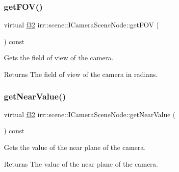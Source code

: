 \subsubsection{\texorpdfstring{get\+F\+O\+V()}{getFOV()}}
{\footnotesize\ttfamily virtual \hyperlink{namespaceirr_a0277be98d67dc26ff93b1a6a1d086b07}{f32} irr\+::scene\+::\+I\+Camera\+Scene\+Node\+::get\+F\+OV (\begin{DoxyParamCaption}{ }\end{DoxyParamCaption}) const\hspace{0.3cm}{\ttfamily [pure virtual]}}



Gets the field of view of the camera. 

\begin{DoxyReturn}{Returns}
The field of view of the camera in radians. 
\end{DoxyReturn}
\mbox{\label{classirr_1_1scene_1_1ICameraSceneNode_aee5dfccee2ec0b0cbcdb1079a6430a25}} 
\subsubsection{\texorpdfstring{get\+Near\+Value()}{getNearValue()}}
{\footnotesize\ttfamily virtual \hyperlink{namespaceirr_a0277be98d67dc26ff93b1a6a1d086b07}{f32} irr\+::scene\+::\+I\+Camera\+Scene\+Node\+::get\+Near\+Value (\begin{DoxyParamCaption}{ }\end{DoxyParamCaption}) const\hspace{0.3cm}{\ttfamily [pure virtual]}}



Gets the value of the near plane of the camera. 

\begin{DoxyReturn}{Returns}
The value of the near plane of the camera. 
\end{DoxyReturn}
\mbox{\label{classirr_1_1scene_1_1ICameraSceneNode_a80f4a43d24dc31d797a84e0e2f62f1a1}} 
